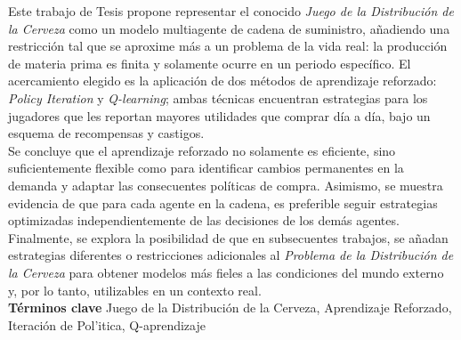 
Este trabajo de Tesis propone representar el conocido \textit{Juego de la Distribuci\'on de la Cerveza} como un modelo multiagente de cadena de suministro, a\~nadiendo una restricci\'on tal que se aproxime m\'as a un problema de la vida real: la producci\'on de materia prima es finita y solamente ocurre en un periodo espec\'ifico. El acercamiento elegido es la aplicaci\'on de dos m\'etodos de aprendizaje reforzado: \textit{Policy Iteration} y \textit{Q-learning}; ambas t\'ecnicas encuentran estrategias para los jugadores que les reportan mayores utilidades que comprar d\'ia a d\'ia, bajo un esquema de recompensas y castigos. \\

Se concluye que el aprendizaje reforzado no solamente es eficiente, sino suficientemente flexible como para identificar cambios permanentes en la demanda y adaptar las consecuentes pol\'iticas de compra. Asimismo, se muestra evidencia de que para cada agente en la cadena, es preferible seguir estrategias optimizadas independientemente de las decisiones de los dem\'as agentes. Finalmente, se explora la posibilidad de que en subsecuentes trabajos, se a\~nadan estrategias diferentes o restricciones adicionales al \textit{Problema de la Distribuci\'on de la Cerveza} para obtener modelos m\'as fieles a las condiciones del mundo externo y, por lo tanto, utilizables en un contexto real.\\

\textbf{T\'erminos clave}
Juego de la Distribuci\'on de la Cerveza, Aprendizaje Reforzado, Iteraci\'on de Pol'itica, Q-aprendizaje
